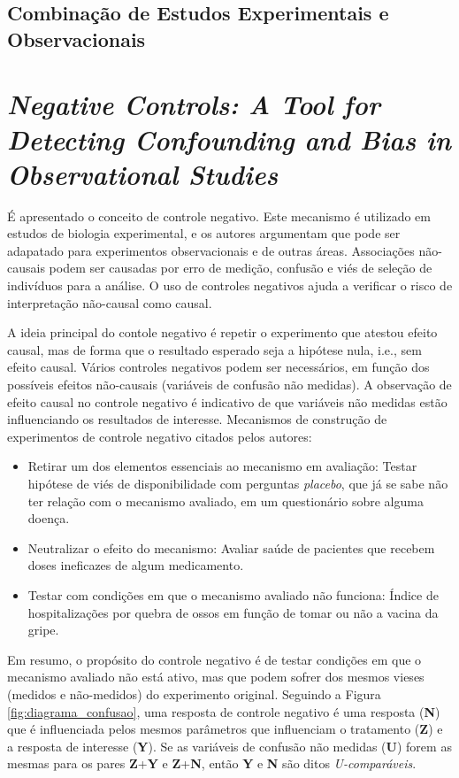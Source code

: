 \documentclass[final,5p]{elsarticle}
\numberwithin{equation}{section}
\begin{document}
    \subsection{Combinação de Estudos Experimentais e Observacionais}



\section{\textit{Negative Controls: A Tool for Detecting Confounding and Bias in Observational Studies}}

    É apresentado o conceito de controle negativo. Este mecanismo é utilizado em estudos de biologia experimental, e os autores argumentam que pode ser adapatado para experimentos observacionais e de outras áreas. Associações não-causais podem ser causadas por erro de medição, confusão e viés de seleção de indivíduos para a análise. O uso de controles negativos ajuda a verificar o risco de interpretação não-causal como causal.

    A ideia principal do contole negativo é repetir o experimento que atestou efeito causal, mas de forma que o resultado esperado seja a hipótese nula, i.e., sem efeito causal. Vários controles negativos podem ser necessários, em função dos possíveis efeitos não-causais (variáveis de confusão não medidas). A observação de efeito causal no controle negativo é indicativo de que variáveis não medidas estão influenciando os resultados de interesse. Mecanismos de construção de experimentos de controle negativo citados pelos autores:

    \begin{itemize}
        \item Retirar um dos elementos essenciais ao mecanismo em avaliação: Testar hipótese de viés de disponibilidade com perguntas \emph{placebo}, que já se sabe não ter relação com o mecanismo avaliado, em um questionário sobre alguma doença.
        \item Neutralizar o efeito do mecanismo: Avaliar saúde de pacientes que recebem doses ineficazes de algum medicamento.
        \item Testar com condições em que o mecanismo avaliado não funciona: Índice de hospitalizações por quebra de ossos em função de tomar ou não a vacina da gripe.
    \end{itemize}

    Em resumo, o propósito do controle negativo é de testar condições em que o mecanismo avaliado não está ativo, mas que podem sofrer dos mesmos vieses (medidos e não-medidos) do experimento original. Seguindo a Figura \ref{fig:diagrama_confusao}, uma resposta de controle negativo é uma resposta (\textbf{N}) que é influenciada pelos mesmos parâmetros que influenciam o tratamento (\textbf{Z}) e a resposta de interesse (\textbf{Y}). Se as variáveis de confusão não medidas (\textbf{U}) forem as mesmas para os pares \textbf{Z}+\textbf{Y} e \textbf{Z}+\textbf{N}, então \textbf{Y} e \textbf{N} são ditos \textit{U-comparáveis}.
\end{document}
